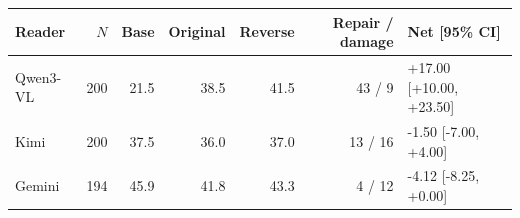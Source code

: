 \begin{tabular}{lrrrrrl}
\toprule
Reader & $N$ & Base & Original & Reverse & Repair / damage & Net [95\% CI]\\
\midrule
Qwen3-VL & 200 & 21.5 & 38.5 & 41.5 & 43 / 9 & +17.00 [+10.00, +23.50]\\
Kimi & 200 & 37.5 & 36.0 & 37.0 & 13 / 16 & -1.50 [-7.00, +4.00]\\
Gemini & 194 & 45.9 & 41.8 & 43.3 & 4 / 12 & -4.12 [-8.25, +0.00]\\
\bottomrule
\end{tabular}

